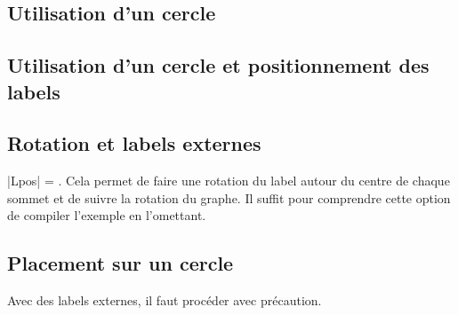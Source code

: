 \subsection{Utilisation d'un cercle }

\begin{tkzexample}[latex=7cm,small]  
\end{tkzexample} 


\subsection{Utilisation d'un cercle  et positionnement des labels }

\begin{tkzexample}[latex=7cm,small]   
\end{tkzexample}



\subsection{Rotation  et labels externes }

|Lpos| = . Cela permet de faire une rotation du label autour du centre de chaque sommet et de suivre la rotation du graphe. Il suffit pour comprendre cette option de compiler l'exemple en l'omettant.  


\begin{tkzexample}[latex=7cm,small] 
\end{tkzexample}


\subsection{Placement sur un cercle }

Avec des labels externes, il faut procéder avec précaution. 

\begin{tkzexample}[latex=7cm,small] 
\end{tkzexample}

  

\endinput
